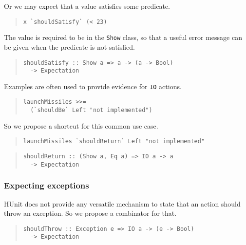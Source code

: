 \documentclass[preprint]{sigplanconf}
\begin{document}
\noindent Or we may expect that a value satisfies some predicate.

\begin{quote}\small\begin{verbatim}
x `shouldSatisfy` (< 23)
\end{verbatim}\end{quote}

\noindent The value is required to be in the \texttt{Show} class, so that a
useful error message can be given when the predicate is not satisfied.

\begin{quote}\small\begin{verbatim}
shouldSatisfy :: Show a => a -> (a -> Bool)
  -> Expectation
\end{verbatim}\end{quote}

\noindent Examples are often used to provide evidence for {\tt IO}
actions.

\begin{quote}\small\begin{verbatim}
launchMissiles >>=
  (`shouldBe` Left "not implemented")
\end{verbatim}\end{quote}

\noindent So we propose a shortcut for this common use case.

\begin{quote}\small\begin{verbatim}
launchMissiles `shouldReturn` Left "not implemented"
\end{verbatim}\end{quote}

\begin{quote}\small\begin{verbatim}
shouldReturn :: (Show a, Eq a) => IO a -> a
  -> Expectation
\end{verbatim}\end{quote}


\subsubsection{Expecting exceptions}

HUnit does not provide any versatile mechanism to state that an action
should throw an exception.  So we propose a combinator for that.

\begin{quote}\small\begin{verbatim}
shouldThrow :: Exception e => IO a -> (e -> Bool)
  -> Expectation
\end{verbatim}\end{quote}
\end{document}
